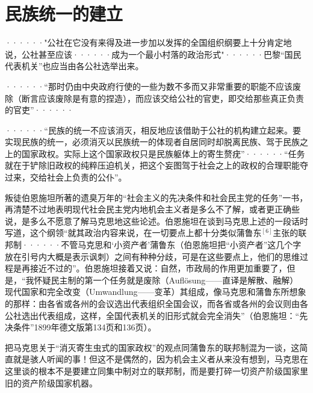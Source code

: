\chapter{民族统一的建立} %

\pskip
\leftskip=10mm
\small

······"公社在它没有来得及进一步加以发挥的全国组织纲要上十分肯定地说，公社甚至应该······成为一个最小村落的政治形式"······巴黎“国民代表机关”也应当由各公社选举出来。

······“那时仍由中央政府行使的一些为数不多而又非常重要的职能不应该废除（断言应该废除是有意的捏造），而应该交给公社的官吏，即交给那些真正负责的官吏”······

······“民族的统一不应该消灭，相反地应该借助于公社的机构建立起来。要实现民族的统一，必须消灭以民族统一的体现者自居同时却脱离民族、驾于民族之上的国家政权。实际上这个国家政权只是民族躯体上的寄生赘疣”······“任务就在于铲除旧政权的纯粹压迫机关，把这个妄图驾于社会之上的政权的合理职能夺过来，交给社会上负责的公仆”。

\normalsize
\leftskip=0mm
\pskip

叛徒伯恩施坦所著的遗臭万年的“社会主义的先决条件和社会民主党的任务”一书，再清楚不过地表明现代社会民主党内地机会主义者是多么不了解，或者更正确些说，是多么不愿意了解马克思地这些论述。伯恩施坦在谈到马克思上述的一段话时写道，这个纲领“就其政治内容来说，在一切要点上都十分类似蒲鲁东$^{[6]}$主张的联邦制······\quad 不管马克思和‘小资产者’蒲鲁东（伯恩施坦把“小资产者”这几个字放在引号内大概是表示讽刺）之间有种种分歧，可是在这些要点上，他们的思维过程是再接近不过的”。伯恩施坦接着又说：自然，市政局的作用更加重要了，但是，“我怀疑民主制的第一个任务就是废除（Aufl\"{o}sung——直译是解散、融解） 现代国家和完全改变（Umwandlung——变革）其组成，像马克思和蒲鲁东所想象的那样：由各省或各州的会议选出代表组织全国会议，而各省或各州的会议则由各公社选出代表组成，这样，全国代表机关的旧形式就会完全消失”（伯恩施坦：“先决条件”1899年德文版第134页和136页）。

把马克思关于“消灭寄生虫式的国家政权”的观点同蒲鲁东的联邦制混为一谈，这简直就是骇人听闻的事！但这不是偶然的，因为机会主义者从来没有想到，马克思在这里谈的根本不是要建立同集中制对立的联邦制，而是要打碎一切资产阶级国家里旧的资产阶级国家机器。

